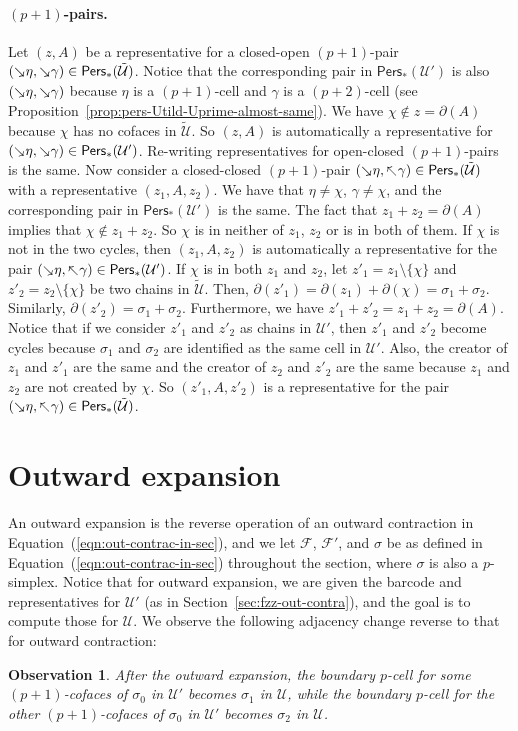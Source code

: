 \documentclass[letterpaper,11pt]{article}
\theoremstyle{mythmstyle}
\theoremstyle{mydefstyle}
\theoremstyle{plain}
\newtheorem{observation}[theorem]{Observation}
\theoremstyle{definition}
\newcommand{\Pers}{\mathsf{Pers}}
\newcommand{\<}[1]{\langle #1\rangle}
\newcommand{\Set}[1]{\{#1\}}
\newcommand{\add}[1]{\mskip-2.5mu\rotatebox[origin=c]{-45}{${\rightarrow}$}{#1}}
\newcommand{\del}[1]{\mskip-2.5mu\rotatebox[origin=c]{-45}{${\leftarrow}$}{#1}}
\newcommand{\Fcal}{\mathcal{F}}
\newcommand{\Ucal}{\mathcal{U}}
\newcommand{\sG}{\sigma}
\newcommand{\Dim}{p}
\newcommand{\extsimp}{\chi}
\begin{document}
\paragraph{$(\Dim+1)$-pairs.}
Let $(z,A)$ be a representative for 
a closed-open 
$(\Dim+1)$-pair $(\add{\eta},\add{\gamma})\in\Pers_*(\tilde{\Ucal})$.
Notice  that the corresponding pair in $\Pers_*({\Ucal}')$
is also $(\add{\eta},\add{\gamma})$ because
$\eta$ is a $(\Dim+1)$-cell
and $\gamma$ is a $(\Dim+2)$-cell (see Proposition~\ref{prop:pers-Utild-Uprime-almost-same}).
We have  $\extsimp\not\in z=\partial(A)$ because $\extsimp$ has no cofaces in $\tilde{\Ucal}$.
So $(z,A)$ is automatically a representative for 
$(\add{\eta},\add{\gamma})\in\Pers_*(\Ucal')$.
Re-writing representatives for 
open-closed 
$(\Dim+1)$-pairs is the same.
Now consider a  closed-closed $(\Dim+1)$-pair $(\add{\eta},\del{\gamma})\in\Pers_*(\tilde{\Ucal})$
with a representative  $(z_1,A,z_2)$.
We have that $\eta\neq\extsimp$, $\gamma\neq\extsimp$,
and the corresponding pair in $\Pers_*({\Ucal}')$
is the same.
The fact that $z_1+z_2=\partial(A)$
implies that $\extsimp\not\in z_1+z_2$.
So $\extsimp$ is in neither of $z_1$, $z_2$
or is in both of them.
If $\extsimp$ is not in the two cycles,
then $(z_1,A,z_2)$ is
automatically a representative for 
the pair $(\add{\eta},\del{\gamma})\in\Pers_*(\Ucal')$.
If $\extsimp$ is in both $z_1$ and $z_2$,
let $z'_1=z_1\setminus\Set{\extsimp}$
and $z'_2=z_2\setminus\Set{\extsimp}$
be two chains in $\tilde{\Ucal}$.
Then, $\partial(z'_1)=\partial(z_1)+\partial(\extsimp)=\sG_1+\sG_2$.
Similarly, $\partial(z'_2)=\sG_1+\sG_2$.
Furthermore, we have $z'_1+z'_2=z_1+z_2=\partial(A)$.
Notice that if we consider $z'_1$ and $z'_2$ as chains in $\Ucal'$,
then $z'_1$ and $z'_2$ become cycles because $\sG_1$ and $\sG_2$
are identified as the same cell in $\Ucal'$.
Also, the creator of $z_1$ and $z'_1$ are the same
and the creator of $z_2$ and $z'_2$ are the same
because $z_1$ and $z_2$ are not created by $\extsimp$.
So $(z'_1,A,z'_2)$
is a representative for 
the pair $(\add{\eta},\del{\gamma})\in\Pers_*(\tilde{\Ucal})$.


\section{Outward expansion}\label{sec:fzz-out-expan} 
An outward expansion is the reverse operation of an outward contraction 
in Equation~(\ref{eqn:out-contrac-in-sec}),
and
 we let $\Fcal$, $\Fcal'$, and $\sG$
be as defined in Equation~(\ref{eqn:out-contrac-in-sec})
throughout the section,
where $\sG$
is also a $\Dim$-simplex.
Notice that 
for outward expansion,
we are given the barcode and representatives for 
$\Ucal'$ (as in Section~\ref{sec:fzz-out-contra}),
and the goal is to compute 
those for 
$\Ucal$.
We observe  the following adjacency change reverse to that for outward contraction:
\begin{observation}
\label{obsv:out-expan-adj-change}
After the outward expansion,
the boundary $\Dim$-cell for some $(\Dim+1)$-cofaces of $\sG_0$
in $\Ucal'$ becomes $\sG_1$ in $\Ucal$,
while the boundary $\Dim$-cell for the other $(\Dim+1)$-cofaces of $\sG_0$
in $\Ucal'$ becomes $\sG_2$ in $\Ucal$.
\end{observation}
\end{document}
